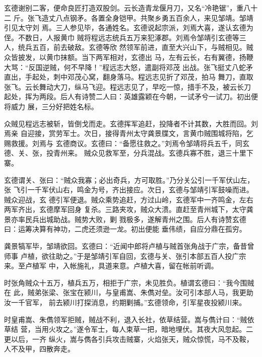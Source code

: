 玄德谢别二客，便命良匠打造双股剑。云长造青龙偃月刀，又名“冷艳锯”，重八十二
斤。张飞造丈八点钢矛。各置全身铠甲。共聚乡勇五百余人，来见邹靖。邹靖引见太守刘
焉。三人参见毕，各通姓名。玄德说起宗派，刘焉大喜，遂认玄德为侄。不数日，人报黄巾
贼将程远志统兵五万来犯涿郡。刘焉令邹靖引玄德等三人，统兵五百，前去破敌。玄德等欣
然领军前进，直至大兴山下，与贼相见。贼众皆披发，以黄巾抹额。当下两军相对，玄德出
马，左有云长，右有翼德，扬鞭大骂：“反国逆贼，何不早降！”程远志大怒，遣副将邓茂
出战。张飞挺丈八蛇矛直出，手起处，刺中邓茂心窝，翻身落马。程远志见折了邓茂，拍马
舞刀，直取张飞。云长舞动大刀，纵马飞迎。程远志见了，早吃一惊，措手不及，被云长刀
起处，挥为两段。后人有诗赞二人曰：英雄露颖在今朝，一试矛兮一试刀。初出便将威力
展，三分好把姓名标。

众贼见程远志被斩，皆倒戈而走。玄德挥军追赶，投降者不计其数，大胜而回。刘焉亲
自迎接，赏劳军士。次日，接得青州太守龚景牒文，言黄巾贼围城将陷，乞赐救援。刘焉与
玄德商议。玄德曰：“备愿往救之。”刘焉令邹靖将兵五千，同玄德、关、张，投青州来。
贼众见救军至，分兵混战。玄德兵寡不胜，退三十里下寨。

玄德谓关、张曰：“贼众我寡；必出奇兵，方可取胜。”乃分关公引一千军伏山左，张
飞引一千军伏山右，鸣金为号，齐出接应。次日，玄德与邹靖引军鼓噪而进。贼众迎战，玄
德引军便退。贼众乘势追赶，方过山岭，玄德军中一齐鸣金，左右两军齐出，玄德摩军回身
复杀。三路夹攻，贼众大溃。直赶至青州城下，太守龚景亦率民兵出城助战。贼势大败，剿
戮极多，遂解青州之围。后人有诗赞玄德曰：运筹决算有神功，二虎还须逊一龙。初出便能
垂伟绩，自应分鼎在孤穷。

龚景犒军毕，邹靖欲回。玄德曰：“近闻中郎将卢植与贼首张角战于广宗，备昔曾师事
卢植，欲往助之。”于是邹靖引军自回，玄德与关、张引本部五百人投广宗来。至卢植军
中，入帐施礼，具道来意。卢植大喜，留在帐前听调。

时张角贼众十五万，植兵五万，相拒于广宗，未见胜负。植谓玄德曰：“我今围贼在
此，贼弟张梁、张宝在颍川，与皇甫嵩、朱儁对垒。汝可引本部人马，我更助汝一千官军，
前去颍川打探消息，约期剿捕。”玄德领命，引军星夜投颍川来。

时皇甫嵩、朱儁领军拒贼，贼战不利，退入长社，依草结营。嵩与儁计曰：“贼依草结
营，当用火攻之。”遂令军士，每人束草一把，暗地埋伏。其夜大风忽起。二更以后，一齐
纵火，嵩与儁各引兵攻击贼寨，火焰张天，贼众惊慌，马不及鞍，人不及甲，四散奔走。

